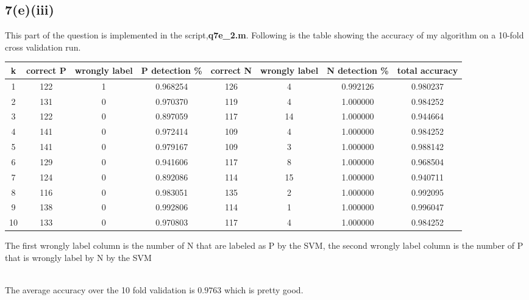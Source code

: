 \documentclass{article}
\begin{document}
\subsection*{7(e)(iii)}
This part of the question is implemented in the script,\textbf{q7e\_2.m}.
Following is the table showing the accuracy of my algorithm on a 10-fold cross validation run.\\
\begin{centering}
\begin{tabular}{|c|c|c|c|c|c|c|c|}
\hline
k & correct P & wrongly label & P detection \% & correct N & wrongly label & N detection \% & total accuracy \\ \hline
1 & 122 & 1 & 0.968254 & 126 & 4 & 0.992126 & 0.980237 \\ \hline 
2 & 131 & 0 & 0.970370 & 119 & 4 & 1.000000 &0.984252 \\ \hline 
3 & 122 & 0 & 0.897059 & 117 & 14 & 1.000000& 0.944664 \\ \hline 
4 & 141 & 0 & 0.972414 & 109 & 4 & 1.000000 &0.984252 \\ \hline 
5 & 141 & 0 & 0.979167 & 109 & 3 & 1.000000 &0.988142 \\ \hline 
6 & 129 & 0 & 0.941606 & 117 & 8 & 1.000000 &0.968504 \\ \hline 
7 & 124 & 0 & 0.892086 & 114 & 15 & 1.000000&0.940711 \\ \hline 
8 & 116 & 0 & 0.983051 & 135 & 2 & 1.000000 &0.992095 \\ \hline 
9 & 138 & 0 & 0.992806 & 114 & 1 & 1.000000 &0.996047 \\ \hline 
10 & 133 & 0 & 0.970803 & 117 & 4 & 1.000000 &0.984252 \\ \hline 
\end{tabular}
\caption{The first wrongly label column is the number of N that are labeled as P by the SVM, the second wrongly label column is the number of P that is wrongly label by N by the SVM}
\end{centering}
\\
The average accuracy over the 10 fold validation is $0.9763$ which is pretty good.
\end{document}
